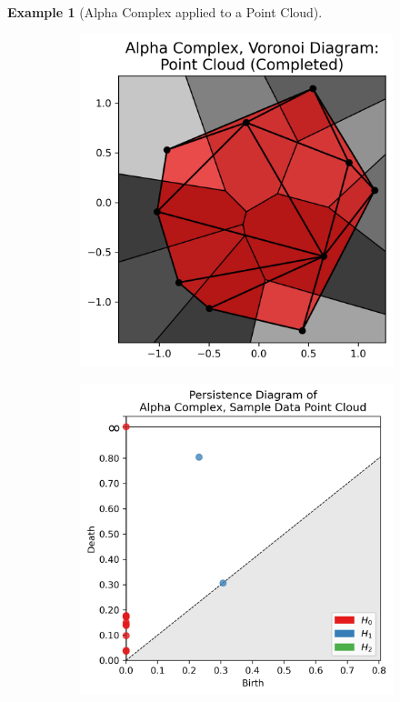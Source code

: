 \documentclass[ma]{uncgdissertationexp}
\theoremstyle{plain}
\theoremstyle{definition}
\newtheorem{example}[theorem]{Example}
\theoremstyle{remark}
\begin{document}
\begin{example}[Alpha Complex applied to a Point Cloud]
\begin{figure}[H]
\begin{subfigure}[b]{0.28\textwidth}
    \end{subfigure}
    \hfill
    \begin{subfigure}[b]{0.28\textwidth}
        \includegraphics[width=\textwidth]{point_cloud_plot_alpha_voronoi.png}
    \end{subfigure}
    \hfill
    \begin{subfigure}[b]{0.28\textwidth}
        \includegraphics[width=\textwidth]{point_cloud_persdia_alpha_voronoi.png}
    \end{subfigure}


\end{figure}
\end{example}
\end{document}
